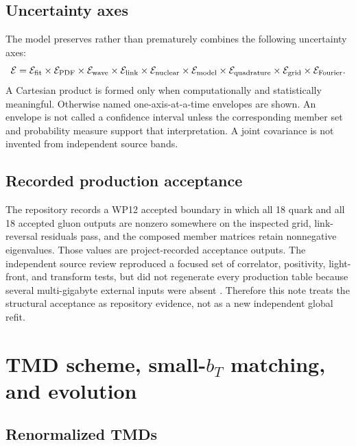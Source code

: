 \documentclass[11pt,oneside]{book}
\begin{document}
\section{Uncertainty axes}

The model preserves rather than prematurely combines the following uncertainty axes:
\begin{equation}
 \mathcal E=
 \mathcal E_{\rm fit}
 \times\mathcal E_{\rm PDF}
 \times\mathcal E_{\rm wave}
 \times\mathcal E_{\rm link}
 \times\mathcal E_{\rm nuclear}
 \times\mathcal E_{\rm model}
 \times\mathcal E_{\rm quadrature}
 \times\mathcal E_{\rm grid}
 \times\mathcal E_{\rm Fourier}.
 \label{eq:uncertainty-product}
\end{equation}
A Cartesian product is formed only when computationally and statistically meaningful.  Otherwise named one-axis-at-a-time envelopes are shown.  An envelope is not called a confidence interval unless the corresponding member set and probability measure support that interpretation.  A joint covariance is not invented from independent source bands.

\section{Recorded production acceptance}

The repository records a WP12 accepted boundary in which all 18 quark and all 18 accepted gluon outputs are nonzero somewhere on the inspected grid, link-reversal residuals pass, and the composed member matrices retain nonnegative eigenvalues.  Those values are project-recorded acceptance outputs.  The independent source review reproduced a focused set of correlator, positivity, light-front, and transform tests, but did not regenerate every production table because several multi-gigabyte external inputs were absent \cite{DWSourceAudit2026,DWProductionBoundary2026}.  Therefore this note treats the structural acceptance as repository evidence, not as a new independent global refit.

\chapter{TMD scheme, \texorpdfstring{small-$b_T$}{small-bT} matching, and evolution}
\label{chap:evolution}

\section{Renormalized TMDs}
\end{document}
